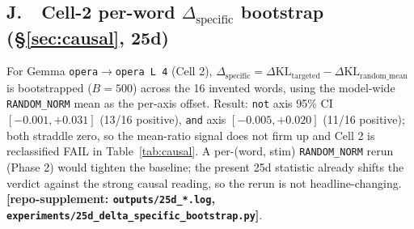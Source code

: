 \documentclass[11pt,letterpaper]{article}
\newcommand{\dkl}{\ensuremath{\Delta\mathrm{KL}}}
\newcommand{\dspec}{\ensuremath{\Delta_{\text{specific}}}}
\begin{document}
\subsection*{J.\ \ Cell-2 per-word \dspec{} bootstrap (\S\ref{sec:causal}, 25d)}
For Gemma \texttt{opera$\to$opera L\,4} (Cell 2), $\dspec
= \dkl_{\text{targeted}} - \dkl_{\text{random\_mean}}$ is bootstrapped
($B = 500$) across the 16 invented words, using the model-wide
\texttt{RANDOM\_NORM} mean as the per-axis offset. Result: \texttt{not}
axis 95\% CI $[-0.001, +0.031]$ (13/16 positive), \texttt{and} axis
$[-0.005, +0.020]$ (11/16 positive); both straddle zero, so the
mean-ratio signal does not firm up and Cell 2 is reclassified FAIL in
Table~\ref{tab:causal}. A per-(word, stim) \texttt{RANDOM\_NORM}
rerun (Phase 2) would tighten the baseline; the present 25d statistic
already shifts the verdict against the strong causal reading, so the
rerun is not headline-changing.
\textbf{[repo-supplement: \texttt{outputs/25d\_*.log},
\texttt{experiments/25d\_delta\_specific\_bootstrap.py}]}.
\end{document}
